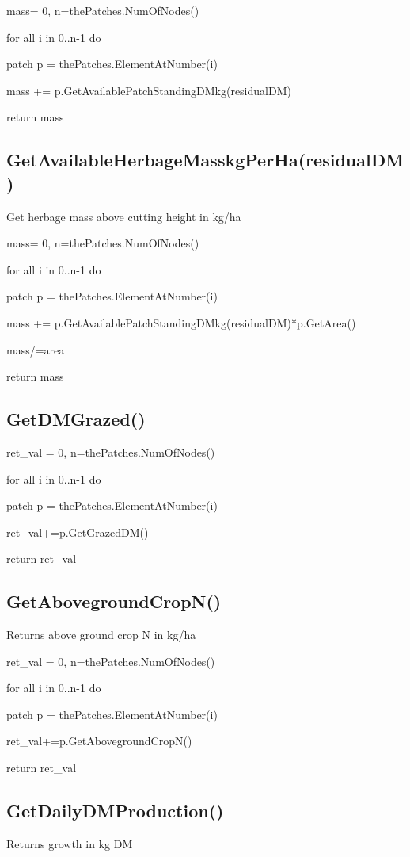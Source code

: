 \documentclass[%
]{scrartcl}
\begin{document}
{{	mass= 0,  n=thePatches.NumOfNodes()
    
   for all i in 0..n-1 do
   
  \quad   patch  p = thePatches.ElementAtNumber(i)
      
  \quad    mass += p.GetAvailablePatchStandingDMkg(residualDM)
      
   return mass

\subsection{GetAvailableHerbageMasskgPerHa(residualDM)}
Get herbage mass above cutting height in kg/ha

	mass= 0,  n=thePatches.NumOfNodes()
    
    for all i in 0..n-1 do
   
   \quad   patch p = thePatches.ElementAtNumber(i)
      
  \quad    mass += p.GetAvailablePatchStandingDMkg(residualDM)*p.GetArea()
      
      
   mass/=area
   
   return mass

\subsection{GetDMGrazed()}
ret\_val = 0, n=thePatches.NumOfNodes()

    for all i in 0..n-1 do
   
  \quad    patch  p = thePatches.ElementAtNumber(i)
      
 \quad     ret\_val+=p.GetGrazedDM()

   return ret\_val


\subsection{GetAbovegroundCropN()}
Returns above ground crop N in kg/ha

   ret\_val = 0,
    n=thePatches.NumOfNodes()
    
    for all i in 0..n-1 do
   
 \quad     patch p = thePatches.ElementAtNumber(i)
      
 \quad     ret\_val+=p.GetAbovegroundCropN()
      
   return ret\_val


\subsection{GetDailyDMProduction()}
Returns growth in kg DM

}}
\end{document}
